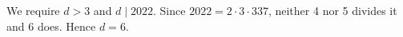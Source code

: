 We require $d>3$ and $d\mid2022$. Since $2022=2\cdot3\cdot337$, neither 4 nor 5 divides it and 6 does. Hence $\boxed{d=6}$.
